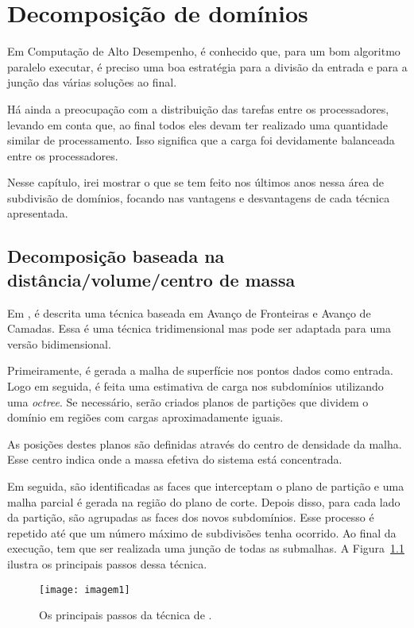 \pagestyle{empty}
\cleardoublepage
\pagestyle{fancy}
\chapter{Decomposição de domínios}\label{cap2}

Em Computação de Alto Desempenho, é conhecido que, para um bom algoritmo paralelo executar, é preciso uma boa estratégia para a divisão da entrada e para a junção das várias soluções ao final. 

Há ainda a preocupação com a distribuição das tarefas entre os processadores, levando em conta que, ao final todos eles devam ter realizado uma quantidade similar de processamento. Isso significa que a carga foi devidamente balanceada entre os processadores.

Nesse capítulo, irei mostrar o que se tem feito nos últimos anos nessa área de subdivisão de domínios, focando nas vantagens e desvantagens de cada técnica apresentada.


\section{Decomposição baseada na distância/volume/centro de massa}

Em \cite{bib:Pirzadeh09}, é descrita uma técnica baseada em Avanço de Fronteiras e Avanço de Camadas. Essa é uma técnica tridimensional mas pode ser adaptada para uma versão bidimensional.

Primeiramente, é gerada a malha de superfície nos pontos dados como entrada. Logo em seguida, é feita uma estimativa de carga nos subdomínios utilizando uma \textit{octree}. Se necessário, serão criados planos de partições que dividem o domínio em regiões com cargas aproximadamente iguais. 

As posições destes planos são definidas através do centro de densidade da malha. Esse centro indica onde a massa efetiva do sistema está concentrada.

Em seguida, são identificadas as faces que interceptam o plano de partição e uma malha parcial é gerada na região do plano de corte. Depois disso, para cada lado da partição, são agrupadas as faces dos novos subdomínios. Esse processo é repetido até que um número máximo de subdivisões tenha ocorrido. Ao final da execução, tem que ser realizada uma junção de todas as submalhas. A Figura~\ref{fig:imagem1} ilustra os principais passos dessa técnica.

 \begin{figure}[htbp]
     \centering
     \texttt{[image: imagem1]}
     \caption{Os principais passos da técnica de \cite{bib:Pirzadeh09}.}
     \label{fig:imagem1}
 \end{figure}
 
